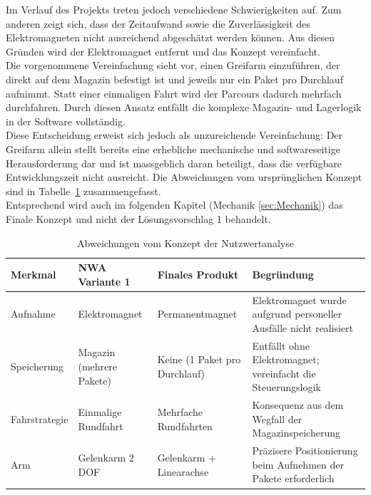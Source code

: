 \documentclass[11pt,a4paper]{article}
\begin{document}
	\noindent
	Im Verlauf des Projekts treten jedoch verschiedene Schwierigkeiten auf. Zum anderen 
	zeigt sich, dass der Zeitaufwand sowie die Zuverlässigkeit des Elektromagneten 
	nicht ausreichend abgeschätzt werden können. Aus diesen Gründen wird der 
	Elektromagnet entfernt und das Konzept vereinfacht.\\
	
	\noindent
	Die vorgenommene Vereinfachung sieht vor, einen Greifarm einzuführen, der direkt 
	auf dem Magazin befestigt ist und jeweils nur ein Paket pro Durchlauf aufnimmt. 
	Statt einer einmaligen Fahrt wird der Parcours dadurch mehrfach durchfahren. 
	Durch diesen Ansatz entfällt die komplexe Magazin- und Lagerlogik in der 
	Software vollständig.\\
	
	\noindent
	Diese Entscheidung erweist sich jedoch als unzureichende Vereinfachung: Der 
	Greifarm allein stellt bereits eine erhebliche mechanische und softwareseitige 
	Herausforderung dar und ist massgeblich daran beteiligt, dass die verfügbare 
	Entwicklungszeit nicht ausreicht. Die Abweichungen vom ursprünglichen Konzept 
	sind in Tabelle~\ref{tab:abweichungen} zusammengefasst.\\
	
	\noindent
	Entsprechend wird auch im folgenden Kapitel (Mechanik \ref{sec:Mechanik}) das Finale Konzept und nicht der Lösungsvorschlag 1 behandelt.
	
	\begin{table}[H]
		\centering
		\caption{Abweichungen vom Konzept der Nutzwertanalyse}
		\label{tab:abweichungen}
		\begin{tabularx}{\textwidth}{|l|X|X|X|}
			\hline
			\textbf{Merkmal} & \textbf{NWA Variante 1} & \textbf{Finales Produkt} & \textbf{Begründung} \\
			\hline
			Aufnahme & Elektromagnet & Permanentmagnet & Elektromagnet wurde aufgrund personeller Ausfälle nicht realisiert \\
			\hline
			Speicherung & Magazin (mehrere Pakete) & Keine (1 Paket pro Durchlauf) & Entfällt ohne Elektromagnet; vereinfacht die Steuerungslogik \\
			\hline
			Fahrstrategie & Einmalige Rundfahrt & Mehrfache Rundfahrten & Konsequenz aus dem Wegfall der Magazinspeicherung \\
			\hline
			Arm & Gelenkarm 2\,DOF & Gelenkarm + Linearachse & Präzisere Positionierung beim Aufnehmen der Pakete erforderlich \\
			\hline
		\end{tabularx}
	\end{table}
	
\end{document}
